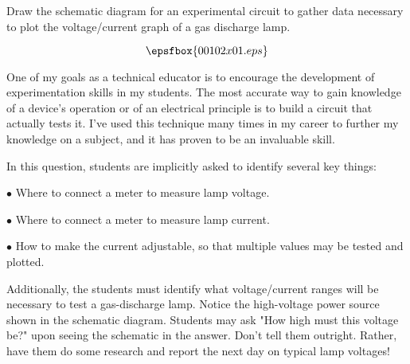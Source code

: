 

Draw the schematic diagram for an experimental circuit to gather data necessary to plot the voltage/current graph of a gas discharge lamp.







$$\epsfbox{00102x01.eps}$$







One of my goals as a technical educator is to encourage the development of experimentation skills in my students.  The most accurate way to gain knowledge of a device's operation or of an electrical principle is to build a circuit that actually tests it.  I've used this technique many times in my career to further my knowledge on a subject, and it has proven to be an invaluable skill.

In this question, students are implicitly asked to identify several key things:

\vskip 10pt

\item {$\bullet$} Where to connect a meter to measure lamp voltage.
\item {$\bullet$} Where to connect a meter to measure lamp current.
\item {$\bullet$} How to make the current adjustable, so that multiple values may be tested and plotted.

\vskip 10pt

Additionally, the students must identify what voltage/current ranges will be necessary to test a gas-discharge lamp.  Notice the high-voltage power source shown in the schematic diagram.  Students may ask "How high must this voltage be?" upon seeing the schematic in the answer.  Don't tell them outright.  Rather, have them do some research and report the next day on typical lamp voltages!




